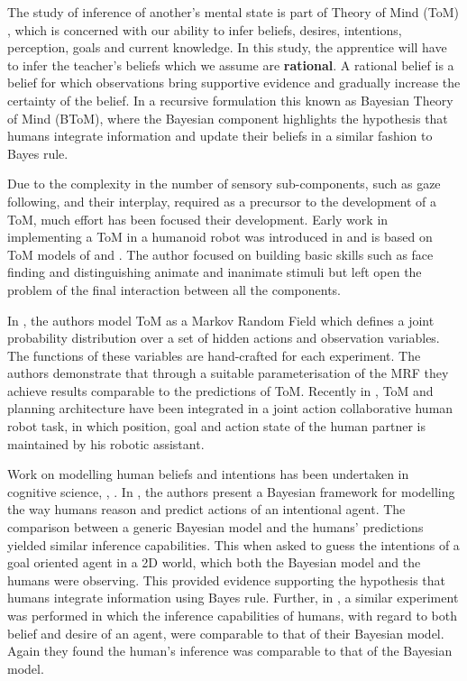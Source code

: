 The study of inference of another's mental state is part of Theory of Mind (ToM) \cite{Towards_a_ToM_2010}, which is concerned 
with our ability to infer beliefs, desires, intentions, perception,
goals and current knowledge. In this study, the apprentice will have to infer the teacher's beliefs which we assume are 
\textbf{rational}. A rational belief is a belief for which observations bring supportive evidence and 
gradually increase the certainty of the belief. In a recursive formulation this known as Bayesian Theory of Mind (BToM),
where the Bayesian component highlights the hypothesis that humans integrate information and update their beliefs in a similar 
fashion to Bayes rule.

Due to the complexity in the number of sensory sub-components, such as gaze following, and their interplay, required as a precursor to the development
of a ToM, much effort has been focused their  development.
Early work in implementing a ToM in a humanoid robot was introduced in \cite{ToM_humanoid} and is based on ToM models of \cite{Leslie_TOMM} 
and \cite{Baron-Cohen}. The author focused on building basic skills such as face finding and distinguishing animate and inanimate 
stimuli but left open the problem of the final interaction between all the components.

In \cite{MRF_ToM}, the authors model ToM as a Markov Random Field which defines a joint probability distribution over a set of
hidden actions and observation variables. The functions of these variables are hand-crafted for each experiment. 
The authors demonstrate that through a suitable parameterisation of the MRF they achieve results comparable to the predictions of ToM.
Recently in \cite{ToM_HRI_2106}, ToM and planning architecture have been integrated in a joint action collaborative human robot task, 
in which position, goal and action state of the human partner is maintained by his robotic assistant.

Work on modelling human beliefs and intentions has been undertaken in cognitive science, \cite{Bake_Saxe_Tene_2011}, 
\cite{Richardson1_Baker1_Tenenbaum1_Saxe1_2012}. In \cite{Bake_Tene_Saxe_2006}, the authors present a Bayesian framework 
for modelling the way humans reason and predict actions of an intentional agent. The comparison between 
a generic Bayesian model and the humans' predictions yielded similar inference capabilities.
This when asked to guess the intentions of a goal oriented agent in a 2D world, which both the Bayesian model and the 
humans were observing. This provided evidence supporting the hypothesis that humans integrate information using Bayes rule. 
Further, in \cite{Bake_Saxe_Tene_2011}, a similar experiment was performed in which the inference capabilities of humans,
with regard to both belief and desire of an agent, were comparable to that of their Bayesian model. Again they found
the human's inference was comparable to that of the Bayesian model.

